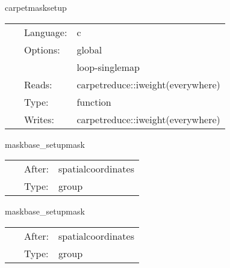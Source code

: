 \vspace{5mm}


\hspace{5mm} carpetmasksetup 

\hspace{5mm}{\it set up the weight function for the restriction regions } 


\hspace{5mm}

 \begin{tabular*}{160mm}{cll} 
~ & Language:  & c \\ 
~ & Options:  & global \\ 
~& ~ &loop-singlemap\\ 
~ & Reads:  & carpetreduce::iweight(everywhere) \\ 
~ & Type:  & function \\ 
~ & Writes:  & carpetreduce::iweight(everywhere) \\ 
\end{tabular*} 


\vspace{5mm}


\hspace{5mm} maskbase\_setupmask 

\hspace{5mm}{\it set up the weight function } 


\hspace{5mm}

 \begin{tabular*}{160mm}{cll} 
~ & After:  & spatialcoordinates \\ 
~ & Type:  & group \\ 
\end{tabular*} 


\vspace{5mm}


\hspace{5mm} maskbase\_setupmask 

\hspace{5mm}{\it set up the weight function } 


\hspace{5mm}

 \begin{tabular*}{160mm}{cll} 
~ & After:  & spatialcoordinates \\ 
~ & Type:  & group \\ 
\end{tabular*} 



